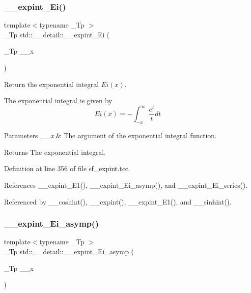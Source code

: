\subsubsection{\texorpdfstring{\+\_\+\+\_\+expint\+\_\+\+Ei()}{\_\_expint\_Ei()}}
{\footnotesize\ttfamily template$<$typename \+\_\+\+Tp $>$ \\
\+\_\+\+Tp std\+::\+\_\+\+\_\+detail\+::\+\_\+\+\_\+expint\+\_\+\+Ei (\begin{DoxyParamCaption}\item[{\+\_\+\+Tp}]{\+\_\+\+\_\+x }\end{DoxyParamCaption})}



Return the exponential integral $ Ei(x) $. 

The exponential integral is given by \[ Ei(x) = -\int_{-x}^\infty \frac{e^t}{t} dt \]


\begin{DoxyParams}{Parameters}
{\em \+\_\+\+\_\+x} & The argument of the exponential integral function. \\
\hline
\end{DoxyParams}
\begin{DoxyReturn}{Returns}
The exponential integral. 
\end{DoxyReturn}


Definition at line 356 of file sf\+\_\+expint.\+tcc.



References \+\_\+\+\_\+expint\+\_\+\+E1(), \+\_\+\+\_\+expint\+\_\+\+Ei\+\_\+asymp(), and \+\_\+\+\_\+expint\+\_\+\+Ei\+\_\+series().



Referenced by \+\_\+\+\_\+coshint(), \+\_\+\+\_\+expint(), \+\_\+\+\_\+expint\+\_\+\+E1(), and \+\_\+\+\_\+sinhint().

\mbox{\label{namespacestd_1_1____detail_ac272ec880c6d4be02b56089a1cebc46d}} 
\subsubsection{\texorpdfstring{\+\_\+\+\_\+expint\+\_\+\+Ei\+\_\+asymp()}{\_\_expint\_Ei\_asymp()}}
{\footnotesize\ttfamily template$<$typename \+\_\+\+Tp $>$ \\
\+\_\+\+Tp std\+::\+\_\+\+\_\+detail\+::\+\_\+\+\_\+expint\+\_\+\+Ei\+\_\+asymp (\begin{DoxyParamCaption}\item[{\+\_\+\+Tp}]{\+\_\+\+\_\+x }\end{DoxyParamCaption})}



